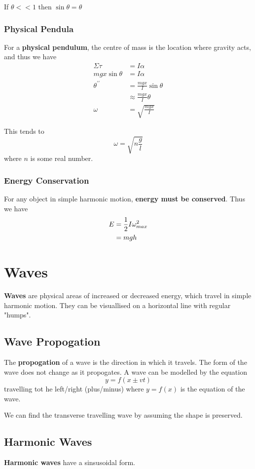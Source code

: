 \documentclass[12pt]{article}
\begin{document}
If $\theta << 1$ then $\sin\theta = \theta$

\subsubsection*{Physical Pendula}
For a {\bf physical pendulum}, the centre of mass is the location where gravity acts, and thus we have
\begin{align*}
\Sigma\tau &= I\alpha\\
mgx\sin\theta &= I\alpha\\
\theta^{\prime\prime} &= \frac{mgx}{I}\sin\theta\\
&\approx \frac{mgx}{I}\theta\\
\omega &= \sqrt{\frac{mgx}{I}}
\end{align*}

This tends to \[ \omega = \sqrt{n\frac{g}{l}} \] where $n$ is some real number.

\subsubsection*{Energy Conservation}
For any object in simple harmonic motion, {\bf energy must be conserved}. Thus we have
\begin{align*}
E &= \frac{1}{2} I\omega_{max}^2\\
&= mgh
\end{align*}

\section*{Waves}
{\bf Waves} are physical areas of increased or decreased energy, which travel in simple harmonic motion. They can be visuallised on a horizontal line with regular "humps".

\subsection*{Wave Propogation}
The {\bf propogation} of a wave is the direction in which it travels. The form of the wave does not change as it propogates. A wave can be modelled by the equation \[ y = f(x\pm vt) \] travelling tot he left/right (plus/minus) where $y = f(x)$ is the equation of the wave.

We can find the transverse travelling wave by assuming the shape is preserved.

\subsection*{Harmonic Waves}
{\bf Harmonic waves} have a sinsusoidal form.
\end{document}
